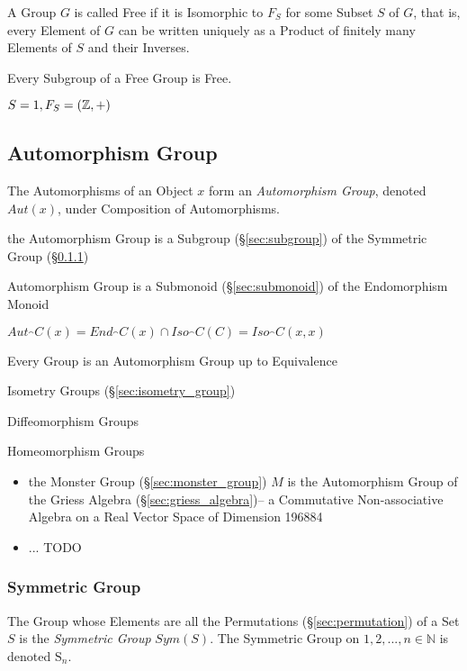 A Group $G$ is called Free if it is Isomorphic to $F_S$ for some
Subset $S$ of $G$, that is, every Element of $G$ can be written
uniquely as a Product of finitely many Elements of $S$ and their
Inverses.

Every Subgroup of a Free Group is Free. \cite{hatcher02}

$S = {1}, F_S = (\mathbb{Z},+)$



\subsection{Automorphism Group}\label{sec:automorphism_group}

The Automorphisms of an Object $x$ form an \emph{Automorphism Group}, denoted
$Aut(x)$, under Composition of Automorphisms.

the Automorphism Group is a Subgroup (\S\ref{sec:subgroup}) of the Symmetric
Group (\S\ref{sec:symmetric_group}) %

Automorphism Group is a Submonoid (\S\ref{sec:submonoid})
of the Endomorphism Monoid %

$Aut_\cat{C}(x) = End_\cat{C}(x) \cap Iso_\cat{C}(C) = Iso_\cat{C}(x,x)$

Every Group is an Automorphism Group up to Equivalence %

Isometry Groups (\S\ref{sec:isometry_group})

Diffeomorphism Groups %

Homeomorphism Groups %

\begin{itemize}
\item the Monster Group (\S\ref{sec:monster_group}) $M$ is the Automorphism
  Group of the Griess Algebra (\S\ref{sec:griess_algebra})-- a Commutative
  Non-associative Algebra on a Real Vector Space of Dimension 196884
\item ... TODO
\end{itemize}



\subsubsection{Symmetric Group}\label{sec:symmetric_group}

The Group whose Elements are all the Permutations (\S\ref{sec:permutation}) of a
Set $S$ is the \emph{Symmetric Group} $Sym(S)$. The Symmetric Group on
${1, 2, ..., n} \in \mathbb{N}$ is denoted $\mathrm{S}_n$.

